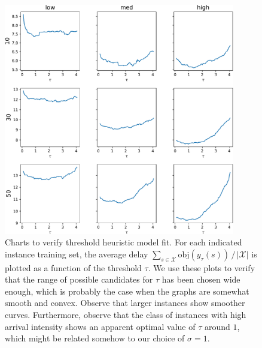 \documentclass[a4paper]{article}
\theoremstyle{definition}
\theoremstyle{plain}
\begin{document}
\begin{figure}
  \centering
  \includegraphics[width=0.9\textwidth]{figures/single/tau_fit.pdf}
  \caption{Charts to verify threshold heuristic model fit. For each indicated
    instance training set, the average delay
    $\sum_{s \in \mathcal{X}} \textrm{obj}(y_{\tau}(s)) \, / \, {|\mathcal{X}|}$
    is plotted as a function of the threshold $\tau$. We use these plots to
    verify that the range of possible candidates for $\tau$ has been chosen wide
    enough, which is probably the case when the graphs are somewhat smooth and
    convex. Observe that larger instances show smoother curves. Furthermore,
    observe that the class of instances with high arrival intensity shows an
    apparent optimal value of $\tau$ around $1$, which might be related somehow
    to our choice of $\sigma = 1$.}
  \label{fig:tau_fit}
\end{figure}
\end{document}
